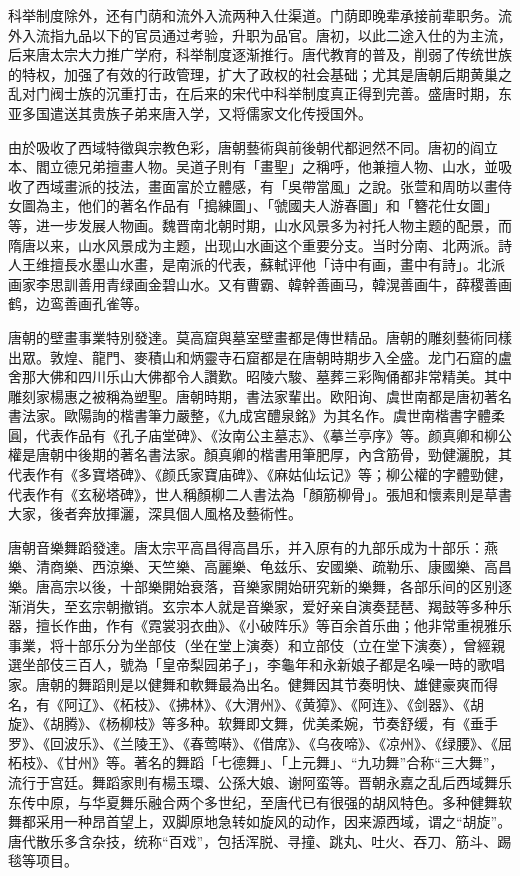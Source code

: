 科举制度除外，还有门荫和流外入流两种入仕渠道。门荫即晚辈承接前辈职务。流外入流指九品以下的官员通过考验，升职为品官。唐初，以此二途入仕的为主流，后来唐太宗大力推广学府，科举制度逐渐推行。唐代教育的普及，削弱了传统世族的特权，加强了有效的行政管理，扩大了政权的社会基础；尤其是唐朝后期黄巢之乱对门阀士族的沉重打击，在后来的宋代中科举制度真正得到完善。盛唐时期，东亚多国遣送其贵族子弟来唐入学，又将儒家文化传授国外。

由於吸收了西域特徵與宗教色彩，唐朝藝術與前後朝代都迥然不同。唐初的阎立本、閻立德兄弟擅畫人物。吴道子則有「畫聖」之稱呼，他兼擅人物、山水，並吸收了西域畫派的技法，畫面富於立體感，有「吳帶當風」之說。张萱和周昉以畫侍女圖為主，他们的著名作品有「搗練圖」、「虢國夫人游春圖」和「簪花仕女圖」等，进一步发展人物画。魏晋南北朝时期，山水风景多为衬托人物主题的配景，而隋唐以来，山水风景成为主题，出现山水画这个重要分支。当时分南、北两派。詩人王维擅長水墨山水畫，是南派的代表，蘇軾评他「诗中有画，畫中有詩」。北派画家李思訓善用青绿画金碧山水。又有曹霸、韓幹善画马，韓滉善画牛，薛稷善画鹤，边鸾善画孔雀等。

唐朝的壁畫事業特別發達。莫高窟與墓室壁畫都是傳世精品。唐朝的雕刻藝術同樣出眾。敦煌、龍門、麥積山和炳靈寺石窟都是在唐朝時期步入全盛。龙门石窟的盧舍那大佛和四川乐山大佛都令人讚歎。昭陵六駿、墓葬三彩陶俑都非常精美。其中雕刻家楊惠之被稱為塑聖。唐朝時期，書法家輩出。欧阳询、虞世南都是唐初著名書法家。歐陽詢的楷書筆力嚴整，《九成宮醴泉銘》为其名作。虞世南楷書字體柔圓，代表作品有《孔子庙堂碑》、《汝南公主墓志》、《摹兰亭序》等。颜真卿和柳公權是唐朝中後期的著名書法家。顏真卿的楷書用筆肥厚，內含筋骨，勁健灑脫，其代表作有《多寶塔碑》、《颜氏家寶庙碑》、《麻姑仙坛记》等；柳公權的字體勁健，代表作有《玄秘塔碑》，世人稱顏柳二人書法為「顏筋柳骨」。張旭和懷素則是草書大家，後者奔放揮灑，深具個人風格及藝術性。

唐朝音樂舞蹈發達。唐太宗平高昌得高昌乐，并入原有的九部乐成为十部乐：燕樂、清商樂、西涼樂、天竺樂、高麗樂、龟兹乐、安國樂、疏勒乐、康國樂、高昌樂。唐高宗以後，十部樂開始衰落，音樂家開始研究新的樂舞，各部乐间的区别逐渐消失，至玄宗朝撤销。玄宗本人就是音樂家，爱好亲自演奏琵琶、羯鼓等多种乐器，擅长作曲，作有《霓裳羽衣曲》、《小破阵乐》等百余首乐曲；他非常重視雅乐事業，将十部乐分为坐部伎（坐在堂上演奏）和立部伎（立在堂下演奏），曾經親選坐部伎三百人，號為「皇帝梨园弟子」，李龜年和永新娘子都是名噪一時的歌唱家。唐朝的舞蹈則是以健舞和軟舞最為出名。健舞因其节奏明快、雄健豪爽而得名，有《阿辽》、《柘枝》、《拂林》、《大渭州》、《黄獐》、《阿连》、《剑器》、《胡旋》、《胡腾》、《杨柳枝》等多种。软舞即文舞，优美柔婉，节奏舒缓，有《垂手罗》、《回波乐》、《兰陵王》、《春莺啭》、《借席》、《乌夜啼》、《凉州》、《绿腰》、《屈柘枝》、《甘州》等。著名的舞蹈「七德舞」、「上元舞」、“九功舞”合称“三大舞”，流行于宫廷。舞蹈家則有楊玉環、公孫大娘、谢阿蛮等。晋朝永嘉之乱后西域舞乐东传中原，与华夏舞乐融合两个多世纪，至唐代已有很强的胡风特色。多种健舞软舞都采用一种昂首望上，双脚原地急转如旋风的动作，因来源西域，谓之“胡旋”。唐代散乐多含杂技，统称“百戏”，包括浑脱、寻撞、跳丸、吐火、吞刀、筋斗、踢毯等项目。


